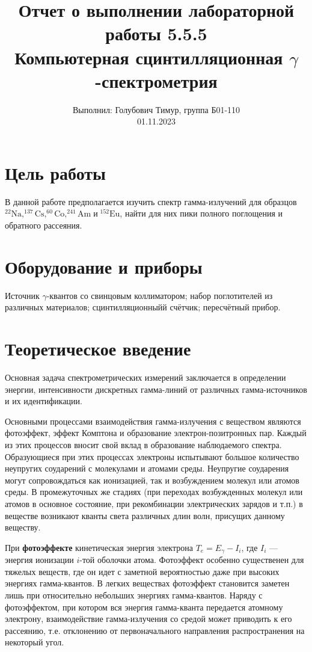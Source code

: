 \documentclass[12pt,a4paper]{article}
\author{\normalsize Выполнил: Голубович Тимур, группа Б01-110 \\
    	\normalsize 01.11.2023}
\date{}
\title{
    	\large Отчет о выполнении лабораторной работы 5.5.5 \\
    	\Large Компьютерная сцинтилляционная $\gamma$-спектрометрия
     }
\begin{document}
\maketitle

\section*{Цель работы}

В данной работе предполагается изучить спектр гамма-излучений для образцов $ \mathrm{^{22}Na, ^{137}Cs, ^{60}Co, ^{241}Am \;} \text{и} \mathrm{\; ^{152}Eu}$, найти для них пики полного поглощения и обратного рассеяния.

\section*{Оборудование и приборы}

Источник  $\gamma$-квантов со свинцовым коллиматором; набор поглотителей из различных материалов; сцинтилляционныйй счётчик; пересчётный прибор.
	
\section*{Теоретическое введение}

Основная задача спектрометрических измерений заключается в определении энергии, интенсивности дискретных гамма-линий от различных гамма-источников и их идентификации.
	
Основными процессами взаимодействия гамма-излучения с веществом являются фотоэффект, эффект Комптона и образование электрон-позитронных пар. Каждый из этих процессов вносит свой вклад в образование наблюдаемого спектра. Образующиеся при этих процессах электроны испытывают большое количество неупругих соударений с молекулами и атомами среды. Неупругие соударения могут сопровождаться как ионизацией, так и возбуждением молекул или атомов среды. В промежуточных же стадиях (при переходах возбужденных молекул или атомов в основное состояние, при рекомбинации электрических зарядов и т.п.) в веществе возникают кванты света различных длин волн, присущих данному веществу.
	
При \textbf{фотоэффекте} кинетическая энергия электрона $ T_e = E_{\gamma} - I_i $, где $ I_i $ --- энергия ионизации $ i $-той оболочки атома. Фотоэффект особенно существенен для тяжелых веществ, где он идет с заметной вероятностью даже при высоких энергиях гамма-квантов. В легких веществах фотоэффект становится заметен лишь при относительно небольших энергиях гамма-квантов. Наряду с фотоэффектом, при котором вся энергия гамма-кванта передается атомному электрону, взаимодействие гамма-излучения со средой может приводить к его рассеянию, т.е. отклонению от первоначального направления распространения на некоторый угол.
	
\end{document}
